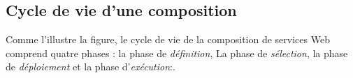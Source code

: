     \subsection{Cycle de vie d'une composition }
    \label{sec:cycle-de-vie+exigences}


    Comme l'illustre la figure, le cycle de vie de la composition de
    services Web comprend quatre phases \cite{sheng2014web}: la phase
    de \textit{définition}, La phase de \textit{sélection}, la phase
    de \textit{déploiement} et la phase d'\textit{exécution}:.

     \SpecialItem

